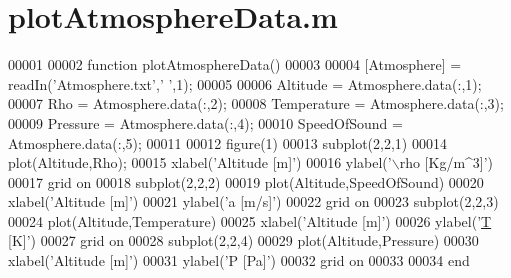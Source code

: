 \hypertarget{plot_atmosphere_data_8m_source}{}\section{plot\+Atmosphere\+Data.\+m}
\label{plot_atmosphere_data_8m_source}

\begin{DoxyCode}
00001 
00002 \textcolor{keyword}{function} plotAtmosphereData()
00003 
00004 [Atmosphere] = readIn(\textcolor{stringliteral}{'Atmosphere.txt'},\textcolor{charliteral}{' '},1);
00005 
00006 Altitude = Atmosphere.data(:,1);
00007 Rho = Atmosphere.data(:,2);
00008 Temperature =  Atmosphere.data(:,3);
00009 Pressure =  Atmosphere.data(:,4);
00010 SpeedOfSound =  Atmosphere.data(:,5);
00011 
00012 figure(1)
00013 subplot(2,2,1)
00014 plot(Altitude,Rho);
00015 xlabel('Altitude [m]')
00016 ylabel('\(\backslash\)rho [Kg/m^3]')
00017 grid on
00018 subplot(2,2,2)
00019 plot(Altitude,SpeedOfSound)
00020 xlabel('Altitude [m]')
00021 ylabel('a [m/s]')
00022 grid on
00023 subplot(2,2,3)
00024 plot(Altitude,Temperature)
00025 xlabel('Altitude [m]')
00026 ylabel('\hyperlink{group___sparse_core___module_class_eigen_1_1_triplet}{T} [K]')
00027 grid on
00028 subplot(2,2,4)
00029 plot(Altitude,Pressure)
00030 xlabel('Altitude [m]')
00031 ylabel('P [Pa]')
00032 grid on
00033 
00034 end
\end{DoxyCode}
